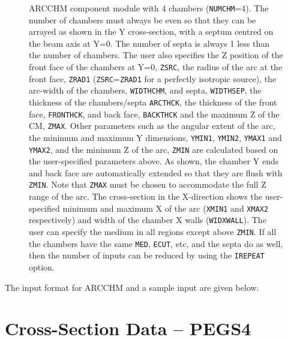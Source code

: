 \documentclass[12pt,twoside]{article}
\begin{document}
\begin{figure}[htbp]
\begin{htmlonly}
\end{htmlonly}
\caption[ARCCHM CM geometry.]
{ARCCHM component module with 4 chambers ({\tt NUMCHM}=4).  The number of
chambers must always be even so that they can be arrayed as shown in
the Y cross-section, with a
septum centred on the beam axis at Y=0.  The number of septa is always 1 less
than the number of chambers.  The user also specifies the Z position of the
front face of the chambers at Y=0, {\tt ZSRC}, the radius of the arc at the
front face, {\tt ZRAD1} ({\tt ZSRC}={\tt ZRAD1} for a perfectly isotropic
source), the arc-width of the chambers, {\tt WIDTHCHM}, and
septa, {\tt WIDTHSEP}, the thickness of the chambers/septa {\tt ARCTHCK},
the thickness of the front face, {\tt FRONTHCK}, and back face, {\tt BACKTHCK}
and the maximum Z of the CM, {\tt ZMAX}.  Other parameters such as the
angular extent of the arc, the minimum and maximum Y dimensions, {\tt YMIN1},
{\tt YMIN2}, {\tt YMAX1} and {\tt YMAX2}, and the minimum Z of the arc,
{\tt ZMIN} are calculated based on the user-specified parameters above.  As shown,
the chamber Y ends and back face are automatically extended so that they
are flush with {\tt ZMIN}.  Note that {\tt ZMAX} must be chosen
to accommodate the full Z range of the arc.  The cross-section in the X-direction
shows the user-specified minimum and maximum X of the arc ({\tt XMIN1} and
{\tt XMAX2} respectively) and width of the chamber X walls ({\tt WIDXWALL}).
The user can specify the medium in all regions except above {\tt ZMIN}.  If
all the chambers have the same {\tt MED}, {\tt ECUT}, etc, and the septa do
as well, then the number of inputs can be reduced by using the {\tt IREPEAT}
option.}
\label{fig_ARCCHMD}
\end{figure}
\clearpage

The input format for ARCCHM and a sample input are given below.

\begin{small}

\end{small}



\clearpage

\renewcommand{\rightmark}{Cross-section data-PEGS4}
\section{Cross-Section Data -- PEGS4}
\label{CSDP}
\end{document}
